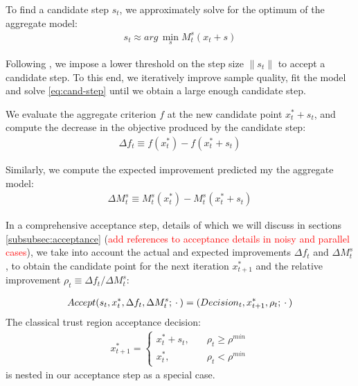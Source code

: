 To find a candidate step $s_t$, we approximately solve for the optimum of the aggregate model:
\begin{align}
    s_t\approx arg\,\min\limits_sM_t^s(x_t+s)
    \label{eq:cand-step}
\end{align}

Following \cite{PowellBobyqa}, we impose a lower threshold on the step size $\lVert s_t\rVert$ to accept a candidate step. To this end, we iteratively improve sample quality, fit the model and solve \ref{eq:cand-step} until we obtain a large enough candidate step.

We evaluate the aggregate criterion $f$ at the new candidate point $x^{*}_t+s_t$, and compute the decrease in the objective produced by the candidate step:
\begin{align}
    \Delta f_t\equiv f(x_t^*) - f(x_t^*+s_t)
    \label{eq:actual-improvement}
\end{align}

Similarly, we compute the expected improvement predicted my the aggregate model:
\begin{align}
    \Delta M^{s}_t\equiv M_t^s(x_t^*) - M_t^s(x_t^*+s_t)
    \label{eq:expected-improvement}
\end{align}

In a comprehensive acceptance step, details of which we will discuss in sections \ref{subsubsec:acceptance} (\textcolor{red}{add references to acceptance details in noisy and parallel cases}), we take into account the actual and expected improvements $\Delta f_t$ and $\Delta M_t^s$, to obtain the candidate point for the next iteration $x_{t+1}^*$ and the relative improvement $\rho_t\equiv \Delta f_t/ \Delta M^s_t$:

\begin{align}
    Accept(s_t,x_t^{*},\Delta f_t,\Delta M_t^s;\hspace{0.2em}\cdot\hspace{0.2em})=(Decision_t,x_{t+1}^{*},\rho_t;\hspace{0.2em}\cdot\hspace{0.2em})
    \label{eq:acceptance-core}
\end{align}
The classical trust region acceptance decision:
\begin{align}
    x_{t+1}^*=\begin{cases}
        x_t^*+s_t,\quad&\rho_t\geq\rho^{min}\\
        x_t^*,\quad&\rho_t<\rho^{min}
    \end{cases}
    \label{eq:accept-classic}
\end{align}
is nested in our acceptance step as a special case.

